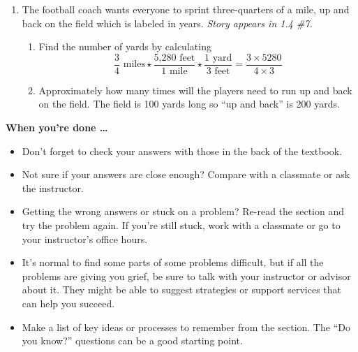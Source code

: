 \begin{enumerate}
\item The football coach wants everyone to sprint three-quarters of a mile, up and back on the field which is labeled in years.  \hfill \emph{Story appears in 1.4 \#7.}
\begin{enumerate}
\item Find the number of yards by calculating
$$\frac{3}{4} \text{ miles}
\star
  \frac{\text{5,280} \text{ feet}}{1 \text{ mile}}
\star
  \frac{\text{1} \text{ yard}}{3 \text{ feet}} = \frac{3 \times 5280}{4 \times 3}$$
  \item Approximately how many times will the players need to run up and back on the field.  The field is 100 yards long so ``up and back'' is 200 yards.  
  \end{enumerate}



  


\end{enumerate}

\bigskip

\noindent \textbf{When you're done \ldots}

\begin{itemize}
\item Don't forget to check your answers with those in the back of the textbook. 
\item Not sure if your answers are close enough? Compare with a classmate or ask the instructor.  
\item Getting the wrong answers or stuck on a problem?  Re-read the section and try the problem again.   If you're still stuck, work with a classmate or go to your instructor's office hours.
\item It's normal to find some parts of some problems difficult, but if all the problems are giving you grief, be sure to talk with your instructor or advisor about it.  They might be able to suggest strategies or support services that can help you succeed.
\item Make a list of key ideas or processes to remember from the section.  The ``Do you know?'' questions can be a good starting point.
\end{itemize}

